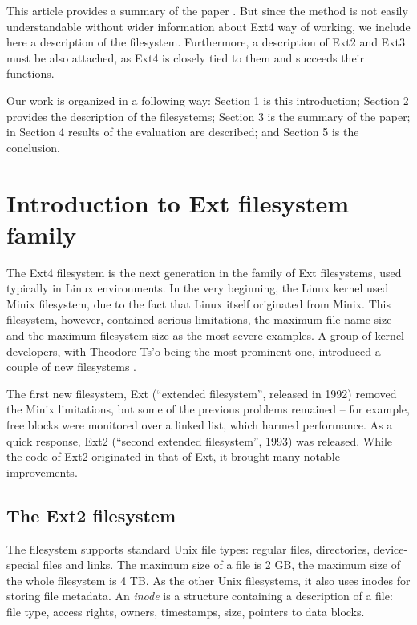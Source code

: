 \documentclass{acm_proc_article-sp}
\begin{document}
This article provides a summary of the paper \cite{afeic}. But since the method is not easily understandable without wider information about Ext4 way of working, we include here a description of the filesystem. Furthermore, a description of Ext2 and Ext3 must be also attached, as Ext4 is closely tied to them and succeeds their functions.

Our work is organized in a following way: Section 1 is this introduction; Section 2 provides the description of the filesystems; Section 3 is the summary of the paper; in Section 4 results of the evaluation are described; and Section 5 is the conclusion.

\section{Introduction to Ext filesystem family}

The Ext4 filesystem is the next generation in the family of Ext filesystems, used typically in Linux environments. In the very beginning, the Linux kernel used Minix filesystem, due to the fact that Linux itself originated from Minix. This filesystem, however, contained serious limitations, the maximum file name size and the maximum filesystem size as the most severe examples. A group of kernel developers, with Theodore Ts'o being the most prominent one, introduced a couple of new filesystems \cite{ext2design}.

The first new filesystem, Ext (``extended filesystem'', released in 1992) removed the Minix limitations, but some of the previous problems remained -- for example, free blocks were monitored over a linked list, which harmed performance. As a quick response, Ext2 (``second extended filesystem'', 1993) was released. While the code of Ext2 originated in that of Ext, it brought many notable improvements.

\subsection{The Ext2 filesystem}

The filesystem supports standard Unix file types: regular files, directories, device-special files and links. The maximum size of a file is 2 GB, the maximum size of the whole filesystem is 4 TB.
As the other Unix filesystems, it also uses inodes for storing file metadata. An {\it inode} is a structure containing a description of a file: file type, access rights, owners, timestamps, size, pointers to data blocks.
\end{document}
